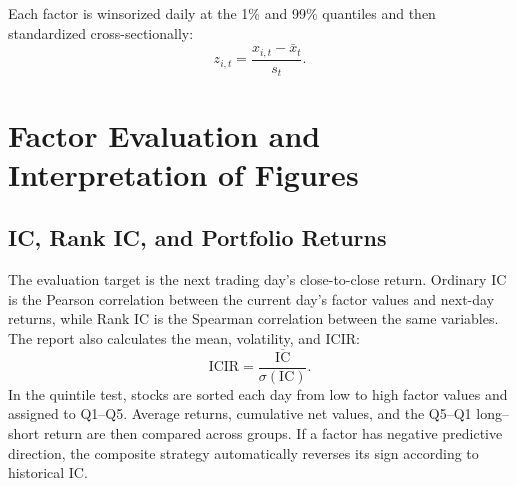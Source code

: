 \documentclass[a4paper,11pt,openany]{report}
\begin{document}
Each factor is winsorized daily at the 1\% and 99\% quantiles and then standardized cross-sectionally:
\begin{equation}
z_{i,t}=\frac{x_{i,t}-\bar x_t}{s_t}.
\end{equation}

\chapter[Factor Evaluation and Interpretation of Figures]{Factor Evaluation and\\Interpretation of Figures}

\section{IC, Rank IC, and Portfolio Returns}

The evaluation target is the next trading day's close-to-close return. Ordinary IC is the Pearson correlation between the current day's factor values and next-day returns, while Rank IC is the Spearman correlation between the same variables. The report also calculates the mean, volatility, and ICIR:
\begin{equation}
\mathrm{ICIR}=\frac{\overline{\mathrm{IC}}}{\sigma(\mathrm{IC})}.
\end{equation}
In the quintile test, stocks are sorted each day from low to high factor values and assigned to Q1--Q5. Average returns, cumulative net values, and the Q5--Q1 long--short return are then compared across groups. If a factor has negative predictive direction, the composite strategy automatically reverses its sign according to historical IC.

\begin{table}[H]
\centering
\small
\caption{Summary of factor evaluation}
\end{table}
\end{document}
